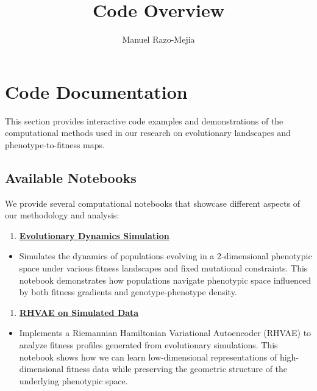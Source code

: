 \documentclass[
]{scrartcl}
\title{Code Overview}
\author[1]{Manuel Razo-Mejia}
\affil[1]{Department of Biology, Stanford University}
\date{}
\providecommand{\tightlist}{%
  \setlength{\itemsep}{0pt}\setlength{\parskip}{0pt}}\usepackage{longtable,booktabs,array}
\begin{document}
\linenumbers
\maketitle
\section{Code Documentation}\label{code-documentation}

This section provides interactive code examples and demonstrations of
the computational methods used in our research on evolutionary
landscapes and phenotype-to-fitness maps.

\subsection{Available Notebooks}\label{available-notebooks}

We provide several computational notebooks that showcase different
aspects of our methodology and analysis:

\begin{enumerate}
\def\labelenumi{\arabic{enumi}.}
\tightlist
\item
  \textbf{\href{code/evolutionary_dynamics.qmd}{Evolutionary Dynamics
  Simulation}}
\end{enumerate}

\begin{itemize}
\tightlist
\item
  Simulates the dynamics of populations evolving in a 2-dimensional
  phenotypic space under various fitness landscapes and fixed mutational
  constraints. This notebook demonstrates how populations navigate
  phenotypic space influenced by both fitness gradients and
  genotype-phenotype density.
\end{itemize}

\begin{enumerate}
\def\labelenumi{\arabic{enumi}.}
\setcounter{enumi}{1}
\tightlist
\item
  \textbf{\href{code/rhvae_sim.qmd}{RHVAE on Simulated Data}}
\end{enumerate}

\begin{itemize}
\tightlist
\item
  Implements a Riemannian Hamiltonian Variational Autoencoder (RHVAE) to
  analyze fitness profiles generated from evolutionary simulations. This
  notebook shows how we can learn low-dimensional representations of
  high-dimensional fitness data while preserving the geometric structure
  of the underlying phenotypic space.
\end{itemize}
\end{document}

